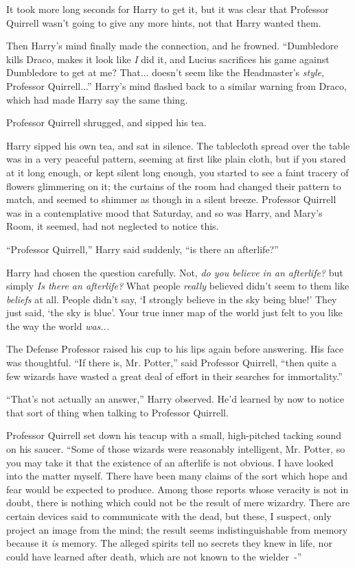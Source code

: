 It took more long seconds for Harry to get it, but it was clear that Professor Quirrell wasn't going to give any more hints, not that Harry wanted them.

Then Harry's mind finally made the connection, and he frowned. ``Dumbledore kills Draco, makes it look like \emph{I} did it, and Lucius sacrifices his game against Dumbledore to get at me? That... doesn't seem like the Headmaster's \emph{style,} Professor Quirrell...'' Harry's mind flashed back to a similar warning from Draco, which had made Harry say the same thing.

Professor Quirrell shrugged, and sipped his tea.

Harry sipped his own tea, and sat in silence. The tablecloth spread over the table was in a very peaceful pattern, seeming at first like plain cloth, but if you stared at it long enough, or kept silent long enough, you started to see a faint tracery of flowers glimmering on it; the curtains of the room had changed their pattern to match, and seemed to shimmer as though in a silent breeze. Professor Quirrell was in a contemplative mood that Saturday, and so was Harry, and Mary's Room, it seemed, had not neglected to notice this.

``Professor Quirrell,'' Harry said suddenly, ``is there an afterlife?''

Harry had chosen the question carefully. Not, \emph{do you believe in an afterlife?} but simply \emph{Is there an afterlife?} What people \emph{really} believed didn't seem to them like \emph{beliefs} at all. People didn't say, `I strongly believe in the sky being blue!' They just said, `the sky is blue'. Your true inner map of the world just felt to you like the way the world \emph{was...}

The Defense Professor raised his cup to his lips again before answering. His face was thoughtful. ``If there is, Mr. Potter,'' said Professor Quirrell, ``then quite a few wizards have wasted a great deal of effort in their searches for immortality.''

``That's not actually an answer,'' Harry observed. He'd learned by now to notice that sort of thing when talking to Professor Quirrell.

Professor Quirrell set down his teacup with a small, high-pitched tacking sound on his saucer. ``Some of those wizards were reasonably intelligent, Mr. Potter, so you may take it that the existence of an afterlife is not obvious. I have looked into the matter myself. There have been many claims of the sort which hope and fear would be expected to produce. Among those reports whose veracity is not in doubt, there is nothing which could not be the result of mere wizardry. There are certain devices said to communicate with the dead, but these, I suspect, only project an image from the mind; the result seems indistinguishable from memory because it \emph{is} memory. The alleged spirits tell no secrets they knew in life, nor could have learned after death, which are not known to the wielder~-''

